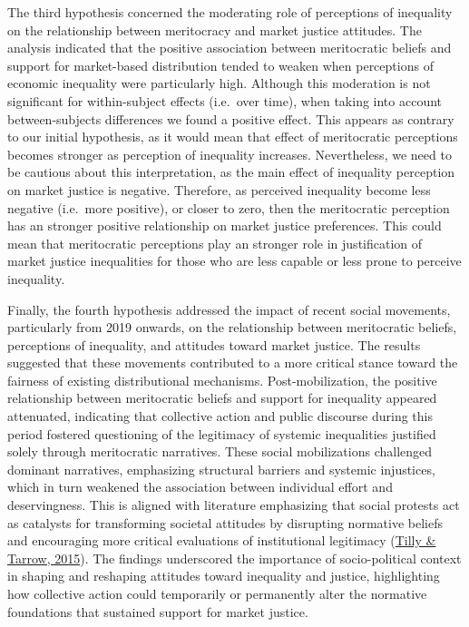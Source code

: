 \documentclass[
  12pt,
]{article}
\begin{document}
The third hypothesis concerned the moderating role of perceptions of
inequality on the relationship between meritocracy and market justice
attitudes. The analysis indicated that the positive association between
meritocratic beliefs and support for market-based distribution tended to
weaken when perceptions of economic inequality were particularly high.
Although this moderation is not significant for within-subject effects
(i.e.~over time), when taking into account between-subjects differences
we found a positive effect. This appears as contrary to our initial
hypothesis, as it would mean that effect of meritocratic perceptions
becomes stronger as perception of inequality increases. Nevertheless, we
need to be cautious about this interpretation, as the main effect of
inequality perception on market justice is negative. Therefore, as
perceived inequality become less negative (i.e.~more positive), or
closer to zero, then the meritocratic perception has an stronger
positive relationship on market justice preferences. This could mean
that meritocratic perceptions play an stronger role in justification of
market justice inequalities for those who are less capable or less prone
to perceive inequality.

Finally, the fourth hypothesis addressed the impact of recent social
movements, particularly from 2019 onwards, on the relationship between
meritocratic beliefs, perceptions of inequality, and attitudes toward
market justice. The results suggested that these movements contributed
to a more critical stance toward the fairness of existing distributional
mechanisms. Post-mobilization, the positive relationship between
meritocratic beliefs and support for inequality appeared attenuated,
indicating that collective action and public discourse during this
period fostered questioning of the legitimacy of systemic inequalities
justified solely through meritocratic narratives. These social
mobilizations challenged dominant narratives, emphasizing structural
barriers and systemic injustices, which in turn weakened the association
between individual effort and deservingness. This is aligned with
literature emphasizing that social protests act as catalysts for
transforming societal attitudes by disrupting normative beliefs and
encouraging more critical evaluations of institutional legitimacy
(\protect\hyperlink{ref-tilly_contentious_2015}{Tilly \& Tarrow, 2015}).
The findings underscored the importance of socio-political context in
shaping and reshaping attitudes toward inequality and justice,
highlighting how collective action could temporarily or permanently
alter the normative foundations that sustained support for market
justice.
\end{document}
